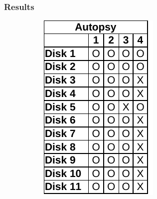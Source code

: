\subsubsection{Results}
\begin{paraphrase}

\begin{figure}
    \centering

    \begin{subfigure}[t]{0.17\linewidth}
        \includegraphics[width=\linewidth]{fig/autopsy_results_fat.pdf}
    \end{subfigure}~~
    \begin{subfigure}[t]{0.17\linewidth}

\end{subfigure}
\end{figure}
\end{paraphrase}
